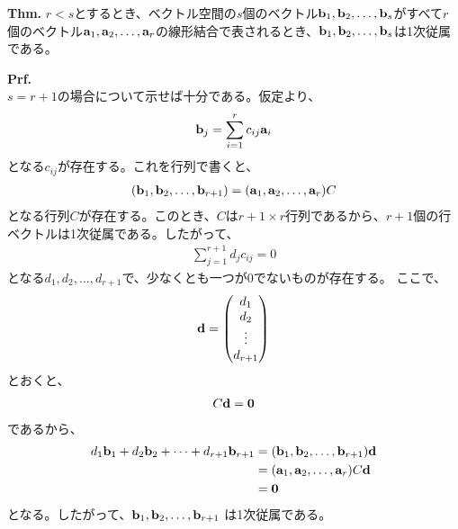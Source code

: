 \documentclass[a4paper,11pt]{jsarticle}
\numberwithin{equation}{section}
\begin{document}
\begin{itembox}[l]{\textbf{Thm.}}
  $r<s$とするとき、ベクトル空間の$s$個のベクトル$\vb{b}_1, \vb{b}_2, \dots, \vb{b}_s$がすべて$r$個のベクトル$\vb{a}_1, \vb{a}_2, \dots, \vb{a}_r$の線形結合で表されるとき、$\vb{b}_1, \vb{b}_2, \dots, \vb{b}_s$は1次従属である。
\end{itembox}
\textbf{Prf.}\\
$s=r+1$の場合について示せば十分である。仮定より、
\begin{align}
  \vb{b}_j = \sum_{i=1}^{r} c_{ij}\vb{a}_i
\end{align}
となる$c_{ij}$が存在する。これを行列で書くと、
\begin{align}
  (\vb{b}_1, \vb{b}_2, \dots, \vb{b}_{r+1}) = (\vb{a}_1, \vb{a}_2, \dots, \vb{a}_r)C
\end{align}
となる行列$C$が存在する。このとき、$C$は$r+1 \times r$行列であるから、$r+1$個の行ベクトルは1次従属である。したがって、
\begin{align}
  \sum_{j=1}^{r+1} d_jc_{ij} = 0
\end{align}
となる$d_1, d_2, \dots, d_{r+1}$で、少なくとも一つが0でないものが存在する。
ここで、
\begin{align}
  \vb{d} = 
  \begin{pmatrix}
    d_1\\
    d_2\\
    \vdots\\
    d_{r+1}
  \end{pmatrix}
\end{align}
とおくと、
\begin{align}
  C\vb{d} = \vb{0}
\end{align}
であるから、
\begin{align}
  d_1\vb{b}_1 + d_2\vb{b}_2 + \dots + d_{r+1}\vb{b}_{r+1} &=
  (\vb{b}_1, \vb{b}_2, \dots, \vb{b}_{r+1})\vb{d}\\
  &= (\vb{a}_1, \vb{a}_2, \dots, \vb{a}_r)C\vb{d}\\
  &= \vb{0}
\end{align}
となる。したがって、$\vb{b}_1, \vb{b}_2, \dots, \vb{b}_{r+1}$ は1次従属である。\hfill\qedsymbol\\
\end{document}
